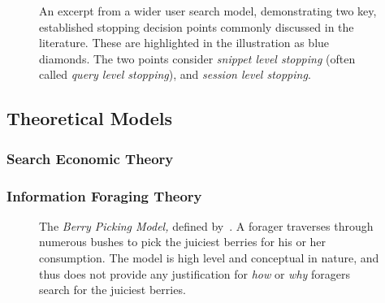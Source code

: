 \begin{figure}[t!]
    \centering
    \caption[Two main stopping decision points of the search process]{An excerpt from a wider user search model, demonstrating two key, established stopping decision points commonly discussed in the literature. These are highlighted in the illustration as {\color{dmax_lightblue}blue} diamonds. The two points consider  \emph{snippet level stopping} (often called \emph{query level stopping}), and  \emph{session level stopping}.}
    \label{fig:model_two_points}
\end{figure}

\subsection{Theoretical Models}

\subsubsection{Search Economic Theory}\label{sec:stopping_background:models:theoretical:set}

\subsubsection{Information Foraging Theory}


\begin{figure}[t!]
    \centering
    \caption[The Berry Picking Model~\cite{bates1989berry_picking}]{The \emph{Berry Picking Model,} defined by~\cite{bates1989berry_picking}. A forager traverses through numerous bushes to pick the juiciest berries for his or her consumption. The model is high level and conceptual in nature, and thus does not provide any justification for \emph{how} or \emph{why} foragers search for the juiciest berries.}
    \label{fig:berry_picking}
\end{figure}


